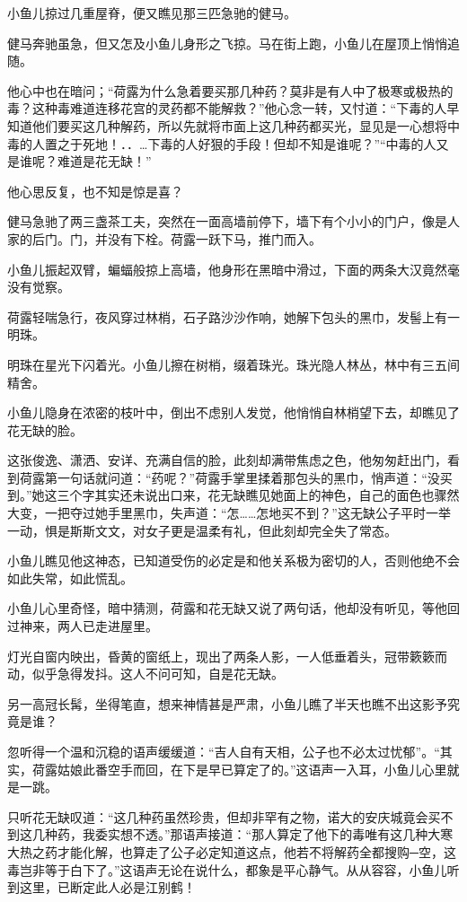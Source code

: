 \documentclass[12pt,oneside]{book}
\begin{document}
小鱼儿掠过几重屋脊，便又瞧见那三匹急驰的健马。

健马奔驰虽急，但又怎及小鱼儿身形之飞掠。马在街上跑，小鱼儿在屋顶上悄悄追随。

他心中也在暗问；``荷露为什么急着要买那几种药？莫非是有人中了极寒或极热的毒？这种毒难道连移花宫的灵药都不能解救？''他心念一转，又忖道：``下毒的人早知道他们要买这几种解药，所以先就将市面上这几种药都买光，显见是一心想将中毒的人置之于死地！．．\ldots 下毒的人好狠的手段！但却不知是谁呢？''``中毒的人又是谁呢？难道是花无缺！''

他心思反复，也不知是惊是喜？

健马急驰了两三盏茶工夫，突然在一面高墙前停下，墙下有个小小的门户，像是人家的后门。门，并没有下栓。荷露一跃下马，推门而入。

小鱼儿振起双臂，蝙蝠般掠上高墙，他身形在黑暗中滑过，下面的两条大汉竟然毫没有觉察。

荷露轻喘急行，夜风穿过林梢，石子路沙沙作响，她解下包头的黑巾，发髻上有一明珠。

明珠在星光下闪着光。小鱼儿擦在树梢，缀着珠光。珠光隐人林丛，林中有三五间精舍。

小鱼儿隐身在浓密的枝叶中，倒出不虑别人发觉，他悄悄自林梢望下去，却瞧见了花无缺的脸。

这张俊逸、潇洒、安详、充满自信的脸，此刻却满带焦虑之色，他匆匆赶出门，看到荷露第一句话就问道：``药呢？''荷露手掌里揉着那包头的黑巾，悄声道：``没买到。''她这三个字其实还未说出口来，花无缺瞧见她面上的神色，自己的面色也骤然大变，一把夺过她手里黑巾，失声道：``怎\ldots\ldots 怎地买不到？''这无缺公子平时一举一动，惧是斯斯文文，对女子更是温柔有礼，但此刻却完全失了常态。

小鱼儿瞧见他这神态，已知道受伤的必定是和他关系极为密切的人，否则他绝不会如此失常，如此慌乱。

小鱼儿心里奇怪，暗中猜测，荷露和花无缺又说了两句话，他却没有听见，等他回过神来，两人已走进屋里。

灯光自窗内映出，昏黄的窗纸上，现出了两条人影，一人低垂着头，冠带簌簌而动，似乎急得发抖。这人不问可知，自是花无缺。

另一高冠长髯，坐得笔直，想来神情甚是严肃，小鱼儿瞧了半天也瞧不出这影予究竟是谁？

忽听得一个温和沉稳的语声缓缓道：``吉人自有天相，公子也不必太过忧郁''。``其实，荷露姑娘此番空手而回，在下是早已算定了的。''这语声一入耳，小鱼儿心里就是一跳。

只听花无缺叹道：``这几种药虽然珍贵，但却非罕有之物，诺大的安庆城竟会买不到这几种药，我委实想不透。''那语声接道：``那人算定了他下的毒唯有这几种大寒大热之药才能化解，也算走了公子必定知道这点，他若不将解药全都搜购─空，这毒岂非等于白下了。''这语声无论在说什么，都象是平心静气。从从容容，小鱼儿听到这里，已断定此人必是江别鹤！
\end{document}
